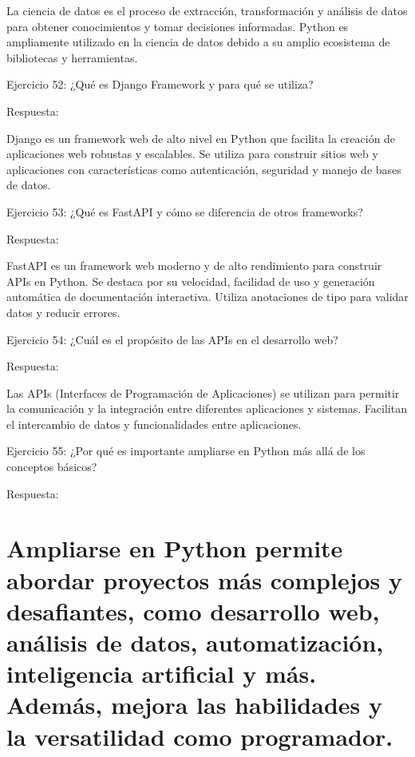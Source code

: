 \documentclass[
  a4paper,
  onepage,
  openany]{scrreprt}
\begin{document}
La ciencia de datos es el proceso de extracción, transformación y
análisis de datos para obtener conocimientos y tomar decisiones
informadas. Python es ampliamente utilizado en la ciencia de datos
debido a su amplio ecosistema de bibliotecas y herramientas.

Ejercicio 52: ¿Qué es Django Framework y para qué se utiliza?

Respuesta:

Django es un framework web de alto nivel en Python que facilita la
creación de aplicaciones web robustas y escalables. Se utiliza para
construir sitios web y aplicaciones con características como
autenticación, seguridad y manejo de bases de datos.

Ejercicio 53: ¿Qué es FastAPI y cómo se diferencia de otros frameworks?

Respuesta:

FastAPI es un framework web moderno y de alto rendimiento para construir
APIs en Python. Se destaca por su velocidad, facilidad de uso y
generación automática de documentación interactiva. Utiliza anotaciones
de tipo para validar datos y reducir errores.

Ejercicio 54: ¿Cuál es el propósito de las APIs en el desarrollo web?

Respuesta:

Las APIs (Interfaces de Programación de Aplicaciones) se utilizan para
permitir la comunicación y la integración entre diferentes aplicaciones
y sistemas. Facilitan el intercambio de datos y funcionalidades entre
aplicaciones.

Ejercicio 55: ¿Por qué es importante ampliarse en Python más allá de los
conceptos básicos?

Respuesta:

\hypertarget{ampliarse-en-python-permite-abordar-proyectos-muxe1s-complejos-y-desafiantes-como-desarrollo-web-anuxe1lisis-de-datos-automatizaciuxf3n-inteligencia-artificial-y-muxe1s.-ademuxe1s-mejora-las-habilidades-y-la-versatilidad-como-programador.}{%
\chapter{Ampliarse en Python permite abordar proyectos más complejos y
desafiantes, como desarrollo web, análisis de datos, automatización,
inteligencia artificial y más. Además, mejora las habilidades y la
versatilidad como
programador.}\label{ampliarse-en-python-permite-abordar-proyectos-muxe1s-complejos-y-desafiantes-como-desarrollo-web-anuxe1lisis-de-datos-automatizaciuxf3n-inteligencia-artificial-y-muxe1s.-ademuxe1s-mejora-las-habilidades-y-la-versatilidad-como-programador.}}
\end{document}
